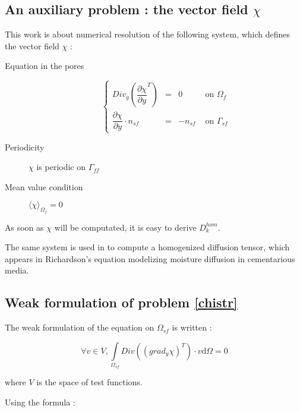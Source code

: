\subsection{An auxiliary problem : the vector field $\chi$}

This work is about numerical resolution of the following system, which defines the vector field $\chi$ :

\begin{description}
\item[Equation in the pores] 
\begin{equation}\label{chistr}
\left\{%
\begin{array}{lccr}
Div_y \left( \dfrac{\partial{\chi}}{\partial{y}}^T\right) &=& 0&\text{ on }\Omega_f \\
\dfrac{\partial{\chi}}{\partial{y}} \cdot n_{sf}&=&-n_{sf}&\text{ on }\Gamma_{sf}
\end{array}
\right.
\end{equation}
\item[Periodicity] $\chi$ is periodic on $\Gamma_{ff}$
\item[Mean value condition] $\langle\chi\rangle_{\Omega_f}=0$
\end{description}

As soon as $\chi$ will be computated, it is easy to derive $D_k^{hom}$.

\ligneinter
The same system is used in \cite{WalMill16} to compute a homogenized diffusion tensor, %
which appears in Richardson's equation modelizing moisture diffusion in cementarious media.

\subsection{Weak formulation of problem \ref{chistr}}

The weak formulation of the equation on $\Omega_{sf}$ is written :

\[\forall v \in V , \int\limits_{\Omega_{sf}}Div\left(\left(grad_y \chi\right)^{T}\right)\cdot v\text{d}\Omega=0\]

where $V$ is the space of test functions.

\par
Using the formula :

